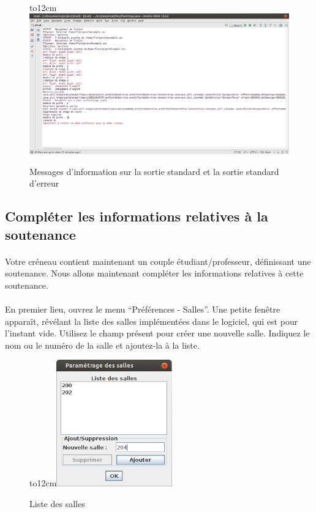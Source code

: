\documentclass[a4paper,10pt]{report}
\begin{document}
	~\\
	\begin{figure}[H]
	  \hbox to12cm{\hss\includegraphics[width=18cm]{../general/console.png}\hss}
	  \caption{Messages d'information sur la sortie standard et la sortie standard d'erreur }
	\end{figure}
	  
	
      \subsection{Compléter les informations relatives à la soutenance}
	\paragraph{}
	  Votre créneau contient maintenant un couple étudiant/professeur, définissant une soutenance.
	  Nous allons maintenant compléter les informations relatives à cette soutenance.
	 
	\paragraph{}
	  En premier lieu, ouvrez le menu ``Préférences - Salles''. 
	  Une petite fenêtre apparaît, révélant la liste des salles implémentées dans le logiciel, qui est pour l'instant vide.
	  Utilisez le champ présent pour créer une nouvelle salle.
	  Indiquez le nom ou le numéro de la salle et ajoutez-la à la liste.
	  
	   \begin{figure}[H]
	    \hbox to12cm{\hss\includegraphics[width=5cm]{../general/Salles.png}\hss}
	    \caption{Liste des salles}
	  \end{figure}
	  
\end{document}
